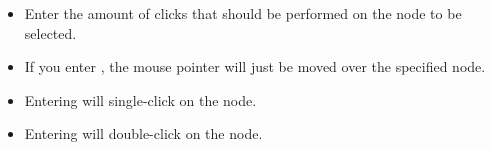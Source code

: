 % 
\begin{itemize}
\item Enter the amount of clicks that should be performed on the node to be selected.
\item If you enter , the mouse pointer will just be moved over the specified node.
\item Entering  will single-click on the node.
\item Entering  will double-click on the node. 
\end{itemize}